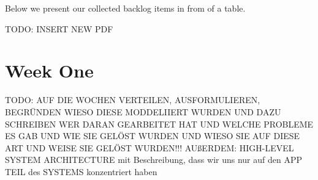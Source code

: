 \documentclass[a4paper, 12pt]{article}
\begin{document}
Below we present our collected backlog items in from of a table.

\color{red}TODO: INSERT NEW PDF \color{black}

\color{black}
\section{Week One}
\color{red}TODO: AUF DIE WOCHEN VERTEILEN, AUSFORMULIEREN, BEGRÜNDEN WIESO DIESE MODDELIIERT WURDEN UND DAZU SCHREIBEN WER DARAN GEARBEITET HAT UND WELCHE PROBLEME ES GAB UND WIE SIE GELÖST WURDEN UND WIESO SIE AUF DIESE ART UND WEISE SIE GELÖST WURDEN!!! AUßERDEM: HIGH-LEVEL SYSTEM ARCHITECTURE mit Beschreibung, dass wir uns nur auf den APP TEIL des SYSTEMS konzentriert haben \color{black}
\end{document}
